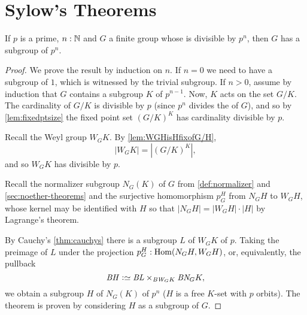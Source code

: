 \section{Sylow's Theorems}
\label{sec:sylow}
\begin{theorem}
  \label{thm:sylow1}
  If $p$ is a prime, $n:\mathbb{N}$ and $G$ a finite group whose \gporder is divisible by $p^n$, then $G$ has a subgroup of \gporder $p^n$.
\end{theorem}
\begin{proof}
  We prove the result by induction on $n$.  
If $n=0$ we need to have a subgroup of \gporder $1$, which is witnessed by the trivial subgroup.
If $n>0$, assume by induction that $G$ contains a subgroup $K$ of \gporder $p^{n-1}$.  
Now, $K$ acts on the set $G/K$.  
The cardinality of $G/K$ is divisible by $p$ (since $p^n$ divides the \gporder of $G$), and so by \cref{lem:fixedptsize} the fixed point set $(G/K)^K$ has cardinality divisible by $p$.  

Recall the Weyl group $W_GK$.
By \cref{lem:WGHisHfixofG/H}, 
$$|W_GK|=|(G/K)^K|,$$
 and so $W_GK$  has \gporder divisible by $p$.  

Recall the normalizer subgroup $N_G(K)$ of $G$ from \cref{def:normalizer} and \cref{sec:noether-theorems} %
and the surjective homomorphism $p_G^H$ from $N_GH$ to $W_GH$, %
whose kernel may be identified with $H$ so that $|N_GH|=|W_GH|\cdot|H|$ by Lagrange's theorem.


By Cauchy's \cref{thm:cauchys} there is a subgroup $L$ of $W_GK$ of \gporder $p$.  
Taking the preimage of $L$ under the projection $p_G^H:\Hom(N_GH,W_GH)$, %
or, equivalently, the pullback
$$\BH\defequi \BL\times_{\BW_GK}\BN_GK,$$
we obtain a subgroup $H$ of $N_G(K)$ of \gporder $p^n$ ($H$ is a free $K$-set with $p$ orbits).  The theorem is proven by considering $H$ as a subgroup of $G$.
\end{proof}

